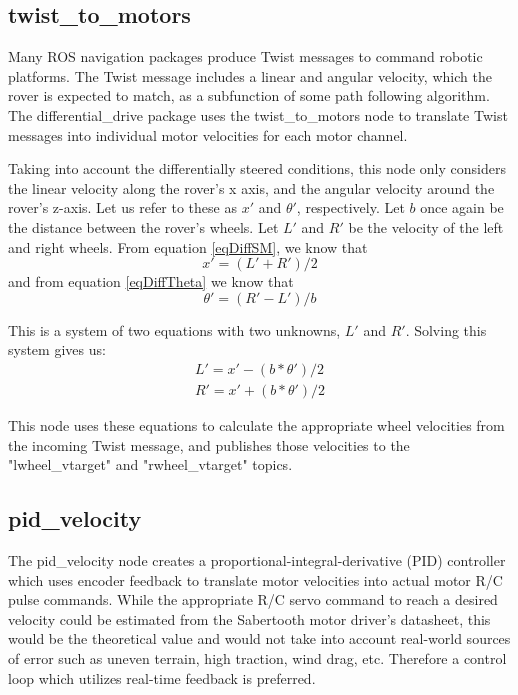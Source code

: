 \subsection{twist\_to\_motors}
Many ROS navigation packages produce Twist messages to command robotic platforms. The Twist message includes a linear and angular velocity, which the rover is expected to match, as a subfunction of some path following algorithm. The differential\_drive package uses the twist\_to\_motors node to translate Twist messages into individual motor velocities for each motor channel. 

Taking into account the differentially steered conditions, this node only considers the linear velocity along the rover's x axis, and the angular velocity around the rover's z-axis. Let us refer to these as \(x'\) and \(\theta '\), respectively. Let \(b\) once again be the distance between the rover's wheels. Let \(L'\) and \(R'\) be the velocity of the left and right wheels. From equation \ref{eqDiffSM}, we know that
\begin{equation*}
x' = (L' + R') / 2
\end{equation*}
and from equation \ref{eqDiffTheta} we know that
\begin{equation*}
\theta ' = (R' - L') / b
\end{equation*}

This is a system of two equations with two unknowns, \(L'\) and \(R'\). Solving this system gives us: 
\begin{align*}
L' = x' - (b * \theta ') / 2 \\
R' = x' + (b * \theta ') / 2
\end{align*}

This node uses these equations to calculate the appropriate wheel velocities from the incoming Twist message, and publishes those velocities to the "lwheel\_vtarget" and "rwheel\_vtarget" topics. 

\subsection{pid\_velocity}
The pid\_velocity node creates a  proportional-integral-derivative (PID) controller which uses encoder feedback to translate motor velocities into actual motor R/C pulse commands. While the appropriate R/C servo command to reach a desired velocity could be estimated from the Sabertooth motor driver's datasheet, this would be the theoretical value and would not take into account real-world sources of error such as uneven terrain, high traction, wind drag, etc. Therefore a control loop which utilizes real-time feedback is preferred.

